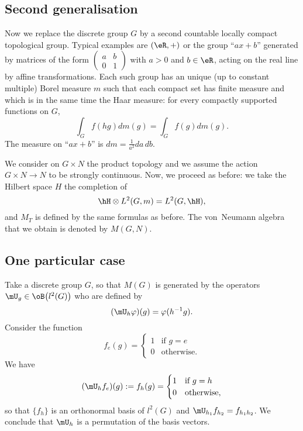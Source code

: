 \subsection{Second generalisation}

Now we replace the discrete group $G$ by a second countable locally compact topological group. Typical examples are $(\eR,+)$ or the group ``$ax+b$'' generated by matrices of the form $\begin{pmatrix}
		a & b \\0&1
	\end{pmatrix}$ with $a>0$ and $b\in \eR$, acting on the real line by affine transformations. Each such group has an unique (up to constant multiple) Borel measure $m$ such that each compact set has finite measure and which is in the same time the Haar measure: for every compactly supported functions on $G$,
\[
	\int_G f(hg)dm(g)=\int_G f(g)dm(g).
\]
The measure on ``$ax+b$'' is $dm=\frac{1}{ a^2 }da\,db$.

We consider on $G\times N$ the product topology and we assume the action $G\times N\to N$ to be strongly continuous. Now, we proceed as before: we take the Hilbert space $H$ the completion of
\[
	\hH\otimes  L^2(G,m)=L^2(G,\hH),
\]
and $M_T$ is defined by the same formulas as before. The von~Neumann algebra that we obtain is denoted by $M(G,N)$.

\subsection{One particular case}
\label{sssOnePartCaseMG}

Take a discrete group $G$, so that $M(G)$ is generated by the operators $\mU_g\in\oB\big( l^2(G) \big)$ who are defined by
\begin{equation}
	(\mU_h\varphi)(g)=\varphi(h^{-1}g).
\end{equation}
Consider the function
\begin{equation}
	f_e(g)=
	\begin{cases}
		1 & \text{if }g=e     \\
		0 & \text{otherwise.}
	\end{cases}
\end{equation}
We have
\[
	(\mU_hf_e)(g):=f_h(g)=
	\begin{cases}
		1 & \text{if }g=h     \\
		0 & \text{otherwise,}
	\end{cases}
\]
so that $\{ f_h \}$ is an orthonormal basis of $l^2(G)$ and $\mU_{h_1}f_{h_2}=f_{h_1h_2}$. We conclude that $\mU_h$ is a permutation of the basis vectors.

